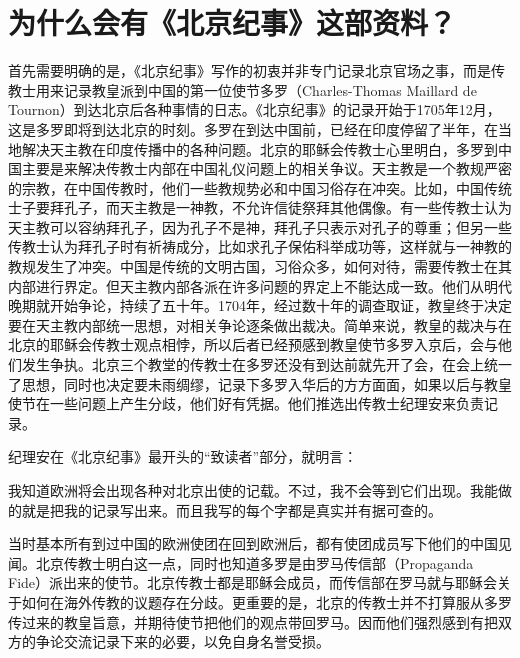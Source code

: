 \section{为什么会有《北京纪事》这部资料？}


首先需要明确的是，《北京纪事》写作的初衷并非专门记录北京官场之事，而是传教士用来记录教皇派到中国的第一位使节多罗（Charles-Thomas Maillard de Tournon）到达北京后各种事情的日志。《北京纪事》的记录开始于1705年12月，这是多罗即将到达北京的时刻。多罗在到达中国前，已经在印度停留了半年，在当地解决天主教在印度传播中的各种问题。北京的耶稣会传教士心里明白，多罗到中国主要是来解决传教士内部在中国礼仪问题上的相关争议。天主教是一个教规严密的宗教，在中国传教时，他们一些教规势必和中国习俗存在冲突。比如，中国传统士子要拜孔子，而天主教是一神教，不允许信徒祭拜其他偶像。有一些传教士认为天主教可以容纳拜孔子，因为孔子不是神，拜孔子只表示对孔子的尊重；但另一些传教士认为拜孔子时有祈祷成分，比如求孔子保佑科举成功等，这样就与一神教的教规发生了冲突。中国是传统的文明古国，习俗众多，如何对待，需要传教士在其内部进行界定。但天主教内部各派在许多问题的界定上不能达成一致。他们从明代晚期就开始争论，持续了五十年。1704年，经过数十年的调查取证，教皇终于决定要在天主教内部统一思想，对相关争论逐条做出裁决。简单来说，教皇的裁决与在北京的耶稣会传教士观点相悖，所以后者已经预感到教皇使节多罗入京后，会与他们发生争执。北京三个教堂的传教士在多罗还没有到达前就先开了会，在会上统一了思想，同时也决定要未雨绸缪，记录下多罗入华后的方方面面，如果以后与教皇使节在一些问题上产生分歧，他们好有凭据。他们推选出传教士纪理安来负责记录。



纪理安在《北京纪事》最开头的“致读者”部分，就明言：



\begin{bookquote}我知道欧洲将会出现各种对北京出使的记载。不过，我不会等到它们出现。我能做的就是把我的记录写出来。而且我写的每个字都是真实并有据可查的。\end{bookquote}


当时基本所有到过中国的欧洲使团在回到欧洲后，都有使团成员写下他们的中国见闻。北京传教士明白这一点，同时也知道多罗是由罗马传信部（Propaganda Fide）派出来的使节。北京传教士都是耶稣会成员，而传信部在罗马就与耶稣会关于如何在海外传教的议题存在分歧。更重要的是，北京的传教士并不打算服从多罗传过来的教皇旨意，并期待使节把他们的观点带回罗马。因而他们强烈感到有把双方的争论交流记录下来的必要，以免自身名誉受损。


